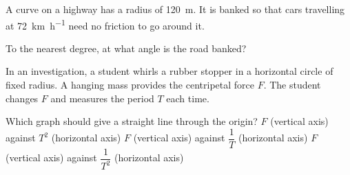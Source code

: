 \begin{quizq}{}
A curve on a highway has a radius of \qty{120}{m}. It is banked so that cars travelling at
\qty{72}{km.h^{-1}} need no friction to go around it.

To the nearest degree, at what angle is the road banked?
\end{quizq}

\begin{quizq}{}
In an investigation, a student whirls a rubber stopper in a horizontal circle of fixed radius. A
hanging mass provides the centripetal force $F$. The student changes $F$ and measures the period
$T$ each time.

Which graph should give a straight line through the origin?
  {$F$ (vertical axis) against $T^2$ (horizontal axis)}
  {$F$ (vertical axis) against $\dfrac{1}{T}$ (horizontal axis)}
  {$F$ (vertical axis) against $\dfrac{1}{T^2}$ (horizontal axis)}
\end{quizq}

